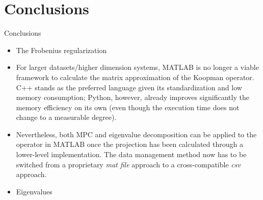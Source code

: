 \documentclass{beamer}
\begin{document}
\section{Conclusions}

\begin{frame}[allowframebreaks]{Conclusions}
    \begin{itemize}
        \item The Frobenius regularization 
        \item For larger datasets/higher dimension systems, MATLAB is no longer a viable framework to calculate the matrix approximation of the Koopman operator. C++ stands as the preferred language given its standardization and low memory consumption; Python, however, already improves significantly the memory efficiency on its own (even though the execution time does not change to a measurable degree).
        \item Nevertheless, both MPC and eigenvalue decomposition can be applied to the operator in MATLAB once the projection has been calculated through a lower-level implementation. The data management method now has to be switched from a proprietary \textit{mat file} approach to a cross-compatible \textit{csv} approach.
        \item Eigenvalues 
    \end{itemize}
\end{frame}
\end{document}
